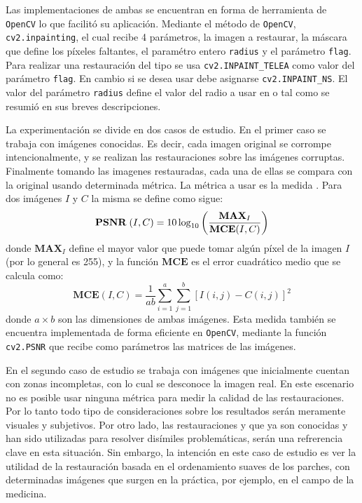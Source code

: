 Las implementaciones de ambas se encuentran en forma de herramienta de \texttt{OpenCV} lo que facilit\'o su aplicaci\'on. Mediante el m\'etodo de \texttt{OpenCV}, \texttt{cv2.inpainting}, el cual recibe 4 par\'ametros, la imagen a restaurar, la m\'ascara que define los p\'ixeles faltantes, el param\'etro entero \texttt{radius} y el par\'ametro \texttt{flag}. Para realizar una restauraci\'on del tipo \TELEA se usa \texttt{cv2.INPAINT\_TELEA} como valor del par\'ametro \texttt{flag}. En cambio si se desea usar \NS debe asignarse \texttt{cv2.INPAINT\_NS}. El valor del par\'ametro \texttt{radius} define el valor del radio a usar en \TELEA o \NS tal como se resumi\'o en sus breves descripciones.

La experimentaci\'on se divide en dos casos de estudio. En el primer caso se trabaja con im\'agenes conocidas. Es decir, cada imagen original se corrompe intencionalmente, y se realizan las restauraciones sobre las im\'agenes corruptas. Finalmente tomando las imagenes restauradas, cada una de ellas se compara con la original usando determinada m\'etrica. La m\'etrica a usar es la medida \PSNR \cite{enwiki:psnr}. Para dos im\'agenes $I$ y $C$ la misma se define como sigue:
\begin{equation}
	\textbf{PSNR}\;(I, C) = 10 \log_{10} \left(\frac{\textbf{MAX}_I}{\textbf{MCE}(I, C)}\right)
\end{equation}
donde $\textbf{MAX}_I$ define el mayor valor que puede tomar alg\'un p\'ixel de la imagen $I$ (por lo general es 255), y la funci\'on $\textbf{MCE}$ es el error cuadr\'atico medio que se calcula como:
\begin{equation}
	\textbf{MCE}(I, C) = \frac{1}{ab}\sum_{i=1}^{a}\sum_{j=1}^{b}[I(i, j) - C(i, j)]^2
\end{equation}
donde $a \times b$ son las dimensiones de ambas im\'agenes. Esta medida tambi\'en se encuentra implementada de forma eficiente en \texttt{OpenCV}, mediante la funci\'on \texttt{cv2.PSNR} que recibe como par\'ametros las matrices de las im\'agenes.

En el segundo caso de estudio se trabaja con im\'agenes que inicialmente cuentan con zonas incompletas, con lo cual se desconoce la imagen real. En este escenario no es posible usar ninguna m\'etrica para medir la calidad de las restauraciones. Por lo tanto todo tipo de consideraciones sobre los resultados ser\'an meramente visuales y subjetivos. Por otro lado, las restauraciones \TELEA y \NS que ya son conocidas y han sido utilizadas para resolver dis\'imiles problem\'aticas, ser\'an una refrerencia clave en esta situaci\'on. Sin embargo, la intenci\'on en este caso de estudio es ver la utilidad de la restauraci\'on basada en el ordenamiento suaves de los parches, con determinadas im\'agenes que surgen en la pr\'actica, por ejemplo, en el campo de la medicina.

